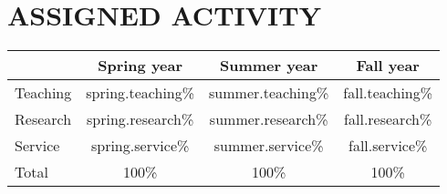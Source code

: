 \section{ASSIGNED ACTIVITY}
\begin{center}
\begin{tabular}{lccc}
& Spring {{year}} & Summer {{year}} & Fall {{year}} \\
\hline
Teaching & {{spring.teaching}}\% & {{summer.teaching}}\% & {{fall.teaching}}\% \\
Research & {{spring.research}}\% & {{summer.research}}\% & {{fall.research}}\% \\
Service & {{spring.service}}\% & {{summer.service}}\% & {{fall.service}}\%  \\
\hline
Total & 100\% & 100\% & 100\%
\end{tabular}
\end{center}